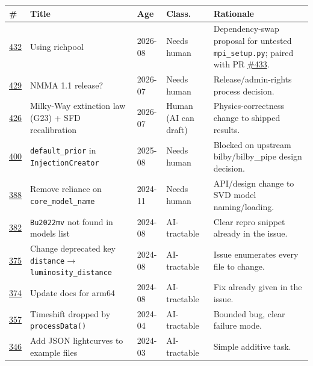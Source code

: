 \documentclass[10pt]{article}
\newcommand{\code}[1]{\texttt{#1}}
\begin{document}
\begingroup
\small
\begin{longtable}{@{}p{0.9cm}p{5.1cm}p{1.2cm}p{2.3cm}p{5.6cm}@{}}
\toprule
\textbf{\#} & \textbf{Title} & \textbf{Age} & \textbf{Class.} & \textbf{Rationale} \\
\midrule
\endhead
\href{https://github.com/nuclear-multimessenger-astronomy/nmma/issues/432}{432} & Using richpool & 2026-08 & Needs human & Dependency-swap proposal for untested \code{mpi\_setup.py}; paired with PR \href{https://github.com/nuclear-multimessenger-astronomy/nmma/issues/433}{\#433}. \\[3pt]
\href{https://github.com/nuclear-multimessenger-astronomy/nmma/issues/429}{429} & NMMA 1.1 release? & 2026-07 & Needs human & Release/admin-rights process decision. \\[3pt]
\href{https://github.com/nuclear-multimessenger-astronomy/nmma/issues/426}{426} & Milky-Way extinction law (G23) + SFD recalibration & 2026-07 & Human (AI can draft) & Physics-correctness change to shipped results. \\[3pt]
\href{https://github.com/nuclear-multimessenger-astronomy/nmma/issues/400}{400} & \code{default\_prior} in \code{InjectionCreator} & 2025-08 & Needs human & Blocked on upstream bilby/bilby\_pipe design decision. \\[3pt]
\href{https://github.com/nuclear-multimessenger-astronomy/nmma/issues/388}{388} & Remove reliance on \code{core\_model\_name} & 2024-11 & Needs human & API/design change to SVD model naming/loading. \\[3pt]
\href{https://github.com/nuclear-multimessenger-astronomy/nmma/issues/382}{382} & \code{Bu2022mv} not found in models list & 2024-08 & AI-tractable & Clear repro snippet already in the issue. \\[3pt]
\href{https://github.com/nuclear-multimessenger-astronomy/nmma/issues/375}{375} & Change deprecated key \code{distance}$\to$\code{luminosity\_distance} & 2024-08 & AI-tractable & Issue enumerates every file to change. \\[3pt]
\href{https://github.com/nuclear-multimessenger-astronomy/nmma/issues/374}{374} & Update docs for arm64 & 2024-08 & AI-tractable & Fix already given in the issue. \\[3pt]
\href{https://github.com/nuclear-multimessenger-astronomy/nmma/issues/357}{357} & Timeshift dropped by \code{processData()} & 2024-04 & AI-tractable & Bounded bug, clear failure mode. \\[3pt]
\href{https://github.com/nuclear-multimessenger-astronomy/nmma/issues/346}{346} & Add JSON lightcurves to example files & 2024-03 & AI-tractable & Simple additive task. \\[3pt]

\end{longtable}
\end{document}
